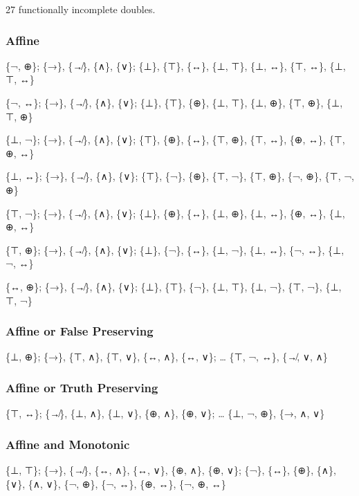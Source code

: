 27 functionally incomplete doubles.

\hypertarget{affine}{%
\subsubsection{Affine}\label{affine}}

\{¬, ⊕\}; \{→\}, \{↛\}, \{∧\}, \{∨\}; \{⊥\}, \{⊤\}, \{↔\}, \{⊥, ⊤\},
\{⊥, ↔\}, \{⊤, ↔\}, \{⊥, ⊤, ↔\}

\{¬, ↔\}; \{→\}, \{↛\}, \{∧\}, \{∨\}; \{⊥\}, \{⊤\}, \{⊕\}, \{⊥, ⊤\},
\{⊥, ⊕\}, \{⊤, ⊕\}, \{⊥, ⊤, ⊕\}

\{⊥, ¬\}; \{→\}, \{↛\}, \{∧\}, \{∨\}; \{⊤\}, \{⊕\}, \{↔\}, \{⊤, ⊕\},
\{⊤, ↔\}, \{⊕, ↔\}, \{⊤, ⊕, ↔\}

\{⊥, ↔\}; \{→\}, \{↛\}, \{∧\}, \{∨\}; \{⊤\}, \{¬\}, \{⊕\}, \{⊤, ¬\},
\{⊤, ⊕\}, \{¬, ⊕\}, \{⊤, ¬, ⊕\}

\{⊤, ¬\}; \{→\}, \{↛\}, \{∧\}, \{∨\}; \{⊥\}, \{⊕\}, \{↔\}, \{⊥, ⊕\},
\{⊥, ↔\}, \{⊕, ↔\}, \{⊥, ⊕, ↔\}

\{⊤, ⊕\}; \{→\}, \{↛\}, \{∧\}, \{∨\}; \{⊥\}, \{¬\}, \{↔\}, \{⊥, ¬\},
\{⊥, ↔\}, \{¬, ↔\}, \{⊥, ¬, ↔\}

\{↔, ⊕\}; \{→\}, \{↛\}, \{∧\}, \{∨\}; \{⊥\}, \{⊤\}, \{¬\}, \{⊥, ⊤\},
\{⊥, ¬\}, \{⊤, ¬\}, \{⊥, ⊤, ¬\}

\hypertarget{affine-or-false-preserving}{%
\subsubsection{Affine or False
Preserving}\label{affine-or-false-preserving}}

\{⊥, ⊕\}; \{→\}, \{⊤, ∧\}, \{⊤, ∨\}, \{↔, ∧\}, \{↔, ∨\}; \ldots{} \{⊤,
¬, ↔\}, \{↛, ∨, ∧\}

\hypertarget{affine-or-truth-preserving}{%
\subsubsection{Affine or Truth
Preserving}\label{affine-or-truth-preserving}}

\{⊤, ↔\}; \{↛\}, \{⊥, ∧\}, \{⊥, ∨\}, \{⊕, ∧\}, \{⊕, ∨\}; \ldots{} \{⊥,
¬, ⊕\}, \{→, ∧, ∨\}

\hypertarget{affine-and-monotonic}{%
\subsubsection{Affine and Monotonic}\label{affine-and-monotonic}}

\{⊥, ⊤\}; \{→\}, \{↛\}, \{↔, ∧\}, \{↔, ∨\}, \{⊕, ∧\}, \{⊕, ∨\}; \{¬\},
\{↔\}, \{⊕\}, \{∧\}, \{∨\}, \{∧, ∨\}, \{¬, ⊕\}, \{¬, ↔\}, \{⊕, ↔\}, \{¬,
⊕, ↔\}


